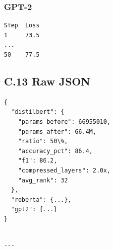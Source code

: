 \subsubsection{GPT-2}
\begin{lstlisting}
Step  Loss
1     73.5
...
50    77.5
\end{lstlisting}

\subsection{C.13 Raw JSON}

\begin{lstlisting}
{
  "distilbert": {
    "params_before": 66955010,
    "params_after": 66.4M,
    "ratio": 50\%,
    "accuracy_pct": 86.4,
    "f1": 86.2,
    "compressed_layers": 2.0x,
    "avg_rank": 32
  },
  "roberta": {...},
  "gpt2": {...}
}
\end{lstlisting}
\begin{lstlisting}

---
\end{lstlisting}